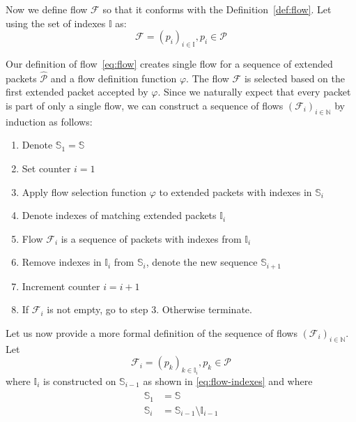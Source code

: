 
Now we define flow $\mathcal{F}$ so that it conforms with the Definition~\ref{def:flow}. Let  using the set of indexes $\mathbb{I}$ as:
\begin{equation}\label{eq:flow}
	\mathcal{F} = (p_i)_{i \in \mathbb{I}}, p_i \in \mathcal{P}
\end{equation}

Our definition of flow~\eqref{eq:flow} creates single flow for a sequence of extended packets $\widehat{\mathcal{P}}$ and a flow definition function $\varphi$. The flow $\mathcal{F}$ is selected based on the first extended packet accepted by $\varphi$. Since we naturally expect that every packet is part of only a single flow, we can construct a sequence of flows $(\mathcal{F}_i)_{i \in \mathbb{N}}$ by induction as follows:
\begin{enumerate}[noitemsep]
	\item Denote $\mathbb{S}_1 = \mathbb{S}$
	\item Set counter $i = 1$
	\item Apply flow selection function $\varphi$ to extended packets with indexes in $\mathbb{S}_i$
	\item Denote indexes of matching extended packets $\mathbb{I}_i$
	\item Flow $\mathcal{F}_i $ is a sequence of packets with indexes from $\mathbb{I}_i$
	\item Remove indexes in $\mathbb{I}_i$ from $\mathbb{S}_i$, denote the new sequence $\mathbb{S}_{i+1}$
	\item Increment counter $i = i + 1$
	\item If $\mathcal{F}_i$ is not empty, go to step 3. Otherwise terminate.
\end{enumerate}

Let us now provide a more formal definition of the sequence of flows $(\mathcal{F}_i)_{i \in \mathbb{N}}$. Let
\begin{equation}
	\mathcal{F}_i = (p_k)_{k \in \mathbb{I}_i}, p_k \in \mathcal{P}
\end{equation}
where $\mathbb{I}_{i}$ is constructed on $\mathbb{S}_{i-1}$ as shown in \eqref{eq:flow-indexes} and where\\
\begin{align*}
\begin{split}
	\mathbb{S}_1 &= \mathbb{S} \\
	\mathbb{S}_i &= \mathbb{S}_{i-1} \setminus \mathbb{I}_{i-1}
\end{split}
\end{align*}


